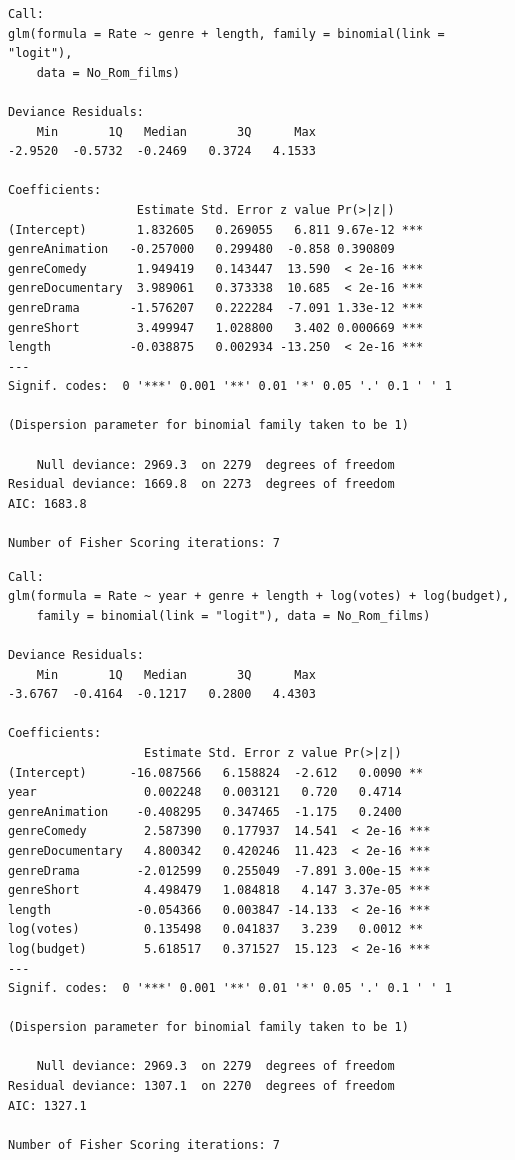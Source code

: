 \documentclass[
]{article}
\begin{document}
\begin{verbatim}
Call:
glm(formula = Rate ~ genre + length, family = binomial(link = "logit"), 
    data = No_Rom_films)

Deviance Residuals: 
    Min       1Q   Median       3Q      Max  
-2.9520  -0.5732  -0.2469   0.3724   4.1533  

Coefficients:
                  Estimate Std. Error z value Pr(>|z|)    
(Intercept)       1.832605   0.269055   6.811 9.67e-12 ***
genreAnimation   -0.257000   0.299480  -0.858 0.390809    
genreComedy       1.949419   0.143447  13.590  < 2e-16 ***
genreDocumentary  3.989061   0.373338  10.685  < 2e-16 ***
genreDrama       -1.576207   0.222284  -7.091 1.33e-12 ***
genreShort        3.499947   1.028800   3.402 0.000669 ***
length           -0.038875   0.002934 -13.250  < 2e-16 ***
---
Signif. codes:  0 '***' 0.001 '**' 0.01 '*' 0.05 '.' 0.1 ' ' 1

(Dispersion parameter for binomial family taken to be 1)

    Null deviance: 2969.3  on 2279  degrees of freedom
Residual deviance: 1669.8  on 2273  degrees of freedom
AIC: 1683.8

Number of Fisher Scoring iterations: 7
\end{verbatim}

\begin{verbatim}
Call:
glm(formula = Rate ~ year + genre + length + log(votes) + log(budget), 
    family = binomial(link = "logit"), data = No_Rom_films)

Deviance Residuals: 
    Min       1Q   Median       3Q      Max  
-3.6767  -0.4164  -0.1217   0.2800   4.4303  

Coefficients:
                   Estimate Std. Error z value Pr(>|z|)    
(Intercept)      -16.087566   6.158824  -2.612   0.0090 ** 
year               0.002248   0.003121   0.720   0.4714    
genreAnimation    -0.408295   0.347465  -1.175   0.2400    
genreComedy        2.587390   0.177937  14.541  < 2e-16 ***
genreDocumentary   4.800342   0.420246  11.423  < 2e-16 ***
genreDrama        -2.012599   0.255049  -7.891 3.00e-15 ***
genreShort         4.498479   1.084818   4.147 3.37e-05 ***
length            -0.054366   0.003847 -14.133  < 2e-16 ***
log(votes)         0.135498   0.041837   3.239   0.0012 ** 
log(budget)        5.618517   0.371527  15.123  < 2e-16 ***
---
Signif. codes:  0 '***' 0.001 '**' 0.01 '*' 0.05 '.' 0.1 ' ' 1

(Dispersion parameter for binomial family taken to be 1)

    Null deviance: 2969.3  on 2279  degrees of freedom
Residual deviance: 1307.1  on 2270  degrees of freedom
AIC: 1327.1

Number of Fisher Scoring iterations: 7
\end{verbatim}
\end{document}
